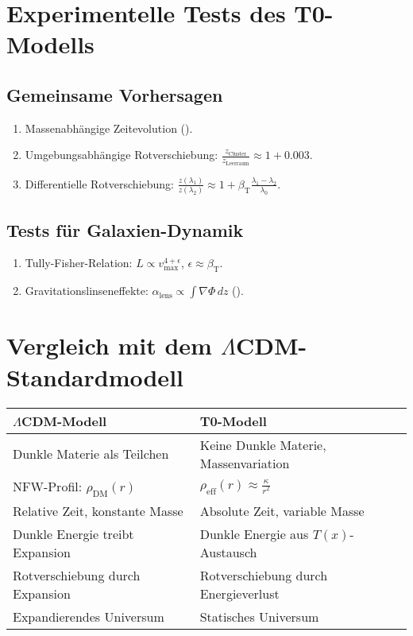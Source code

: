 \documentclass[a4paper,12pt]{article}
\theoremstyle{definition}
\theoremstyle{remark}
\newcommand{\Tfield}{T(x)}
\newcommand{\betaT}{\beta_{\text{T}}}
\begin{document}
	\section{Experimentelle Tests des T0-Modells}
	
	\subsection{Gemeinsame Vorhersagen}
	
	\begin{enumerate}
		\item Massenabhängige Zeitevolution (\cite{pascher_photons_2025}).
		\item Umgebungsabhängige Rotverschiebung: \(\frac{z_{\text{Cluster}}}{z_{\text{Leerraum}}} \approx 1 + 0.003\).
		\item Differentielle Rotverschiebung: \(\frac{z(\lambda_1)}{z(\lambda_2)} \approx 1 + \betaT \frac{\lambda_1 - \lambda_2}{\lambda_0}\).
	\end{enumerate}
	
	\subsection{Tests für Galaxien-Dynamik}
	
	\begin{enumerate}
		\item Tully-Fisher-Relation: \(L \propto v_{\text{max}}^{4 + \epsilon}\), \(\epsilon \approx \betaT\).
		\item Gravitationslinseneffekte: \(\alpha_{\text{lens}} \propto \int \nabla \Phi \, dz\) (\cite{pascher_galaxies_2025}).
	\end{enumerate}
	
	\section{Vergleich mit dem \(\Lambda\)CDM-Standardmodell}
	
	\begin{tcolorbox}[colback=yellow!5!white,colframe=yellow!75!black,title=Vergleich der Modelle]
		\begin{tabular}{p{}|p{}}
			\toprule
			\textbf{\(\Lambda\)CDM-Modell} & \textbf{T0-Modell} \\
			\midrule
			Dunkle Materie als Teilchen & Keine Dunkle Materie, Massenvariation \\
			NFW-Profil: \(\rho_{\text{DM}}(r)\) & \(\rho_{\text{eff}}(r) \approx \frac{\kappa}{r^2}\) \\
			Relative Zeit, konstante Masse & Absolute Zeit, variable Masse \\
			Dunkle Energie treibt Expansion & Dunkle Energie aus \(\Tfield\)-Austausch \\
			Rotverschiebung durch Expansion & Rotverschiebung durch Energieverlust \\
			Expandierendes Universum & Statisches Universum \\
			\bottomrule
		\end{tabular}
	\end{tcolorbox}
	
\end{document}
